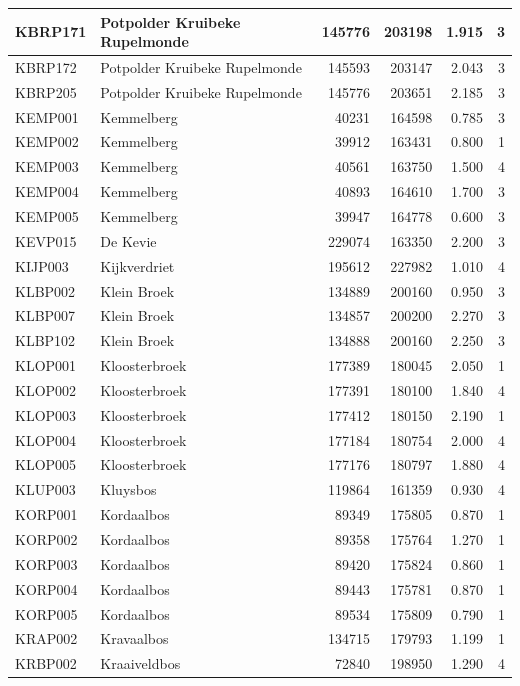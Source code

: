 \documentclass[11pt,]{book}
\begin{document}
\begin{table}
\begin{tabular}[t]{l|l|r|r|r|r}
\hline
KBRP171 & Potpolder Kruibeke Rupelmonde & 145776 & 203198 & 1.915 & 3\\
\hline
KBRP172 & Potpolder Kruibeke Rupelmonde & 145593 & 203147 & 2.043 & 3\\
\hline
KBRP205 & Potpolder Kruibeke Rupelmonde & 145776 & 203651 & 2.185 & 3\\
\hline
KEMP001 & Kemmelberg & 40231 & 164598 & 0.785 & 3\\
\hline
KEMP002 & Kemmelberg & 39912 & 163431 & 0.800 & 1\\
\hline
KEMP003 & Kemmelberg & 40561 & 163750 & 1.500 & 4\\
\hline
KEMP004 & Kemmelberg & 40893 & 164610 & 1.700 & 3\\
\hline
KEMP005 & Kemmelberg & 39947 & 164778 & 0.600 & 3\\
\hline
KEVP015 & De Kevie & 229074 & 163350 & 2.200 & 3\\
\hline
KIJP003 & Kijkverdriet & 195612 & 227982 & 1.010 & 4\\
\hline
KLBP002 & Klein Broek & 134889 & 200160 & 0.950 & 3\\
\hline
KLBP007 & Klein Broek & 134857 & 200200 & 2.270 & 3\\
\hline
KLBP102 & Klein Broek & 134888 & 200160 & 2.250 & 3\\
\hline
KLOP001 & Kloosterbroek & 177389 & 180045 & 2.050 & 1\\
\hline
KLOP002 & Kloosterbroek & 177391 & 180100 & 1.840 & 4\\
\hline
KLOP003 & Kloosterbroek & 177412 & 180150 & 2.190 & 1\\
\hline
KLOP004 & Kloosterbroek & 177184 & 180754 & 2.000 & 4\\
\hline
KLOP005 & Kloosterbroek & 177176 & 180797 & 1.880 & 4\\
\hline
KLUP003 & Kluysbos & 119864 & 161359 & 0.930 & 4\\
\hline
KORP001 & Kordaalbos & 89349 & 175805 & 0.870 & 1\\
\hline
KORP002 & Kordaalbos & 89358 & 175764 & 1.270 & 1\\
\hline
KORP003 & Kordaalbos & 89420 & 175824 & 0.860 & 1\\
\hline
KORP004 & Kordaalbos & 89443 & 175781 & 0.870 & 1\\
\hline
KORP005 & Kordaalbos & 89534 & 175809 & 0.790 & 1\\
\hline
KRAP002 & Kravaalbos & 134715 & 179793 & 1.199 & 1\\
\hline
KRBP002 & Kraaiveldbos & 72840 & 198950 & 1.290 & 4\\

\end{tabular}
\end{table}
\end{document}
